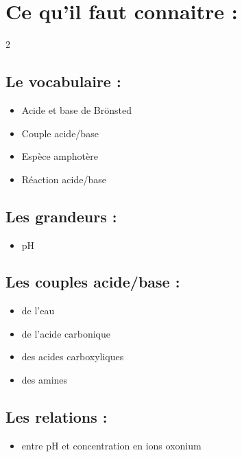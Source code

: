 \documentclass[a4paper,11pt,fleqn]{article}%
\begin{document}
\maketitle

\section*{Ce qu'il faut connaitre :}
\begin{multicols}{2}
\subsection*{Le vocabulaire :}
    \begin{itemize}[label=$\square$]
    \item Acide et base de Brönsted
    \item Couple acide/base
    \item Espèce amphotère
    \item Réaction acide/base
    \end{itemize}
\subsection*{Les grandeurs :}
    \begin{itemize}[label=$\square$]
        \item pH
    \end{itemize}
\subsection*{Les couples acide/base :}
    \begin{itemize}[label=$\square$]
        \item de l'eau
        \item de l'acide carbonique
        \item des acides carboxyliques
        \item des amines
    \end{itemize}
\subsection*{Les relations :}
    \begin{itemize}[label=$\square$]
        \item entre pH et concentration en ions oxonium
    \end{itemize}
\end{multicols}
\end{document}
